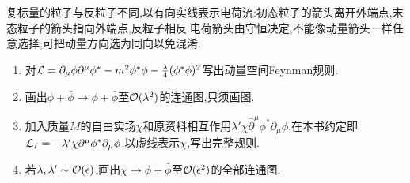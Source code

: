 \begin{exercise}
复标量的粒子与反粒子不同,以有向实线表示电荷流:初态粒子的箭头离开外端点,末态粒子的箭头指向外端点,反粒子相反.电荷箭头由守恒决定,不能像动量箭头一样任意选择;可把动量方向选为同向以免混淆.
\begin{enumerate}[label=(\alph*)]
\item 对$\mathcal L=\partial_\mu\phi\partial^\mu\phi^*-m^2\phi^*\phi-\frac\lambda4(\phi^*\phi)^2$写出动量空间Feynman规则.
\item 画出$\phi+\bar\phi\to\phi+\bar\phi$至$\mathcal O(\lambda^2)$的连通图,只须画图.
\item 加入质量$M$的自由实场$\chi$和原资料相互作用$\lambda'\chi\widehat\partial^\mu\phi^*\partial_\mu\phi$,在本书约定即$\mathcal L_I=-\lambda'\chi\partial^\mu\phi^*\partial_\mu\phi$.以虚线表示$\chi$,写出完整规则.
\item 若$\lambda,\lambda'\sim\mathcal O(\epsilon)$,画出$\chi\to\phi+\bar\phi$至$\mathcal O(\epsilon^2)$的全部连通图.
\end{enumerate}
\end{exercise}
